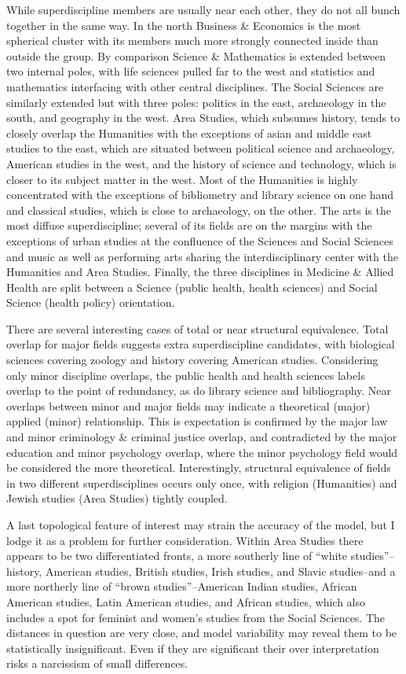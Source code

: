 \documentclass[]{book}
\theoremstyle{definition}
\theoremstyle{definition}
\theoremstyle{definition}
\theoremstyle{remark}
\begin{document}
While superdiscipline members are usually near each other, they do not
all bunch together in the same way. In the north Business \& Economics
is the most spherical cluster with its members much more strongly
connected inside than outside the group. By comparison Science \&
Mathematics is extended between two internal poles, with life sciences
pulled far to the west and statistics and mathematics interfacing with
other central disciplines. The Social Sciences are similarly extended
but with three poles: politics in the east, archaeology in the south,
and geography in the west. Area Studies, which subsumes history, tends
to closely overlap the Humanities with the exceptions of asian and
middle east studies to the east, which are situated between political
science and archaeology, American studies in the west, and the history
of science and technology, which is closer to its subject matter in the
west. Most of the Humanities is highly concentrated with the exceptions
of bibliometry and library science on one hand and classical studies,
which is close to archaeology, on the other. The arts is the most
diffuse superdiscipline; several of its fields are on the margins with
the exceptions of urban studies at the confluence of the Sciences and
Social Sciences and music as well as performing arts sharing the
interdisciplinary center with the Humanities and Area Studies. Finally,
the three disciplines in Medicine \& Allied Health are split between a
Science (public health, health sciences) and Social Science (health
policy) orientation.

There are several interesting cases of total or near structural
equivalence. Total overlap for major fields suggests extra
superdiscipline candidates, with biological sciences covering zoology
and history covering American studies. Considering only minor discipline
overlaps, the public health and health sciences labels overlap to the
point of redundancy, as do library science and bibliography. Near
overlaps between minor and major fields may indicate a theoretical
(major) applied (minor) relationship. This is expectation is confirmed
by the major law and minor criminology \& criminal justice overlap, and
contradicted by the major education and minor psychology overlap, where
the minor psychology field would be considered the more theoretical.
Interestingly, structural equivalence of fields in two different
superdisciplines occurs only once, with religion (Humanities) and Jewish
studies (Area Studies) tightly coupled.

A last topological feature of interest may strain the accuracy of the
model, but I lodge it as a problem for further consideration. Within
Area Studies there appears to be two differentiated fronts, a more
southerly line of ``white studies''--history, American studies, British
studies, Irish studies, and Slavic studies--and a more northerly line of
``brown studies''--American Indian studies, African American studies,
Latin American studies, and African studies, which also includes a spot
for feminist and women's studies from the Social Sciences. The distances
in question are very close, and model variability may reveal them to be
statistically insignificant. Even if they are significant their over
interpretation risks a narcissism of small differences.
\end{document}
